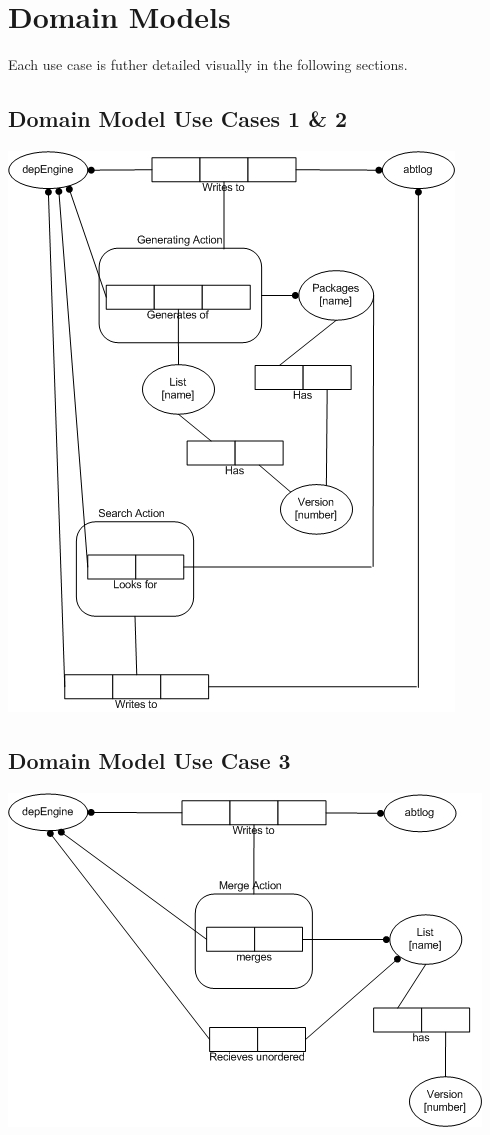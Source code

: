 \newpage

\section{Domain Models}
Each use case is futher detailed visually in the following sections.

\subsection{Domain Model Use Cases 1 \& 2}
\includegraphics{dms/ORM001.jpg}
\subsection{Domain Model Use Case 3}
\includegraphics{dms/ORM003.jpg}
